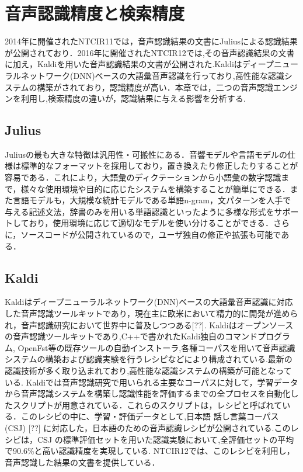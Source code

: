\chapter{音声認識精度と検索精度}
2014年に開催されたNTCIR11では，音声認識結果の文書にJuliusによる認識結果が公開されており．2016年に開催されたNTCIR12では,その音声認識結果の文書に加え，Kaldiを用いた音声認識結果の文書が公開された.Kaldiはディープニューラルネットワーク(DNN)ベースの大語彙音声認識を行っており,高性能な認識システムの構築がされており，認識精度が高い．本章では，二つの音声認識エンジンを利用し,検索精度の違いが，認識結果に与える影響を分析する.


\section{Julius}
Juliusの最も大きな特徴は汎用性・可搬性にある．音響モデルや言語モデルの仕様は標準的なフォーマットを採用しており，置き換えたり修正したりすることが容易である．これにより，大語彙のディクテーションから小語彙の数字認識まで，様々な使用環境や目的に応じたシステムを構築することが簡単にできる．また言語モデルも，大規模な統計モデルである単語n-gram，文パターンを人手で与える記述文法，辞書のみを用いる単語認識といったように多様な形式をサポートしており，使用環境に応じて適切なモデルを使い分けることができる．さらに，ソースコードが公開されているので，ユーザ独自の修正や拡張も可能である．

\section{Kaldi}
Kaldiはディープニューラルネットワーク(DNN)ベースの大語彙音声認識に対応した音声認識ツールキットであり，現在主に欧米において精力的に開発が進められ，音声認識研究において世界中に普及しつつある[??]. Kaldiはオープンソースの音声認識ツールキットであり,C++で書かれたKaldi独自のコマンドプログラム, OpenFst等の既存ツールの自動インストーラ,各種コーパスを用いて音声認識システムの構築および認識実験を行うレシピなどにより構成されている.最新の認識技術が多く取り込まれており,高性能な認識システムの構築が可能となっている.
Kaldiでは音声認識研究で用いられる主要なコーパスに対して，学習データから音声認識システムを構築し認識性能を評価するまでの全プロセスを自動化したスクリプトが用意されている．これらのスクリプトは，レシピと呼ばれている．このレシピの中に、学習・評価データとして,日本語 話し言葉コーパス(CSJ) [??] に対応した，日本語のための音声認識レシピが公開されている.このレシピは，CSJ の標準評価セットを用いた認識実験において,全評価セットの平均で90.6\%と高い認識精度を実現している. NTCIR12では、このレシピを利用し，音声認識した結果の文書を提供している．

